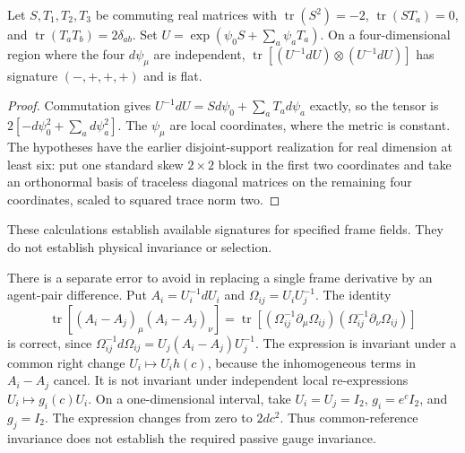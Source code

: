 \begin{proposition}
\label{prop:4d_signature}
Let $S,T_1,T_2,T_3$ be commuting real matrices with $\operatorname{tr}(S^2)=-2$, $\operatorname{tr}(ST_a)=0$, and $\operatorname{tr}(T_aT_b)=2\delta_{ab}$. Set $U=\exp(\psi_0S+\sum_a\psi_aT_a)$. On a four-dimensional region where the four $d\psi_\mu$ are independent, $\operatorname{tr}[(U^{-1}dU)\otimes(U^{-1}dU)]$ has signature $(-,+,+,+)$ and is flat.
\end{proposition}
\begin{proof}
Commutation gives $U^{-1}dU=S d\psi_0+\sum_aT_a d\psi_a$ exactly, so the tensor is $2[-d\psi_0^2+\sum_a d\psi_a^2]$. The $\psi_\mu$ are local coordinates, where the metric is constant. The hypotheses have the earlier disjoint-support realization for real dimension at least six: put one standard skew $2\times2$ block in the first two coordinates and take an orthonormal basis of traceless diagonal matrices on the remaining four coordinates, scaled to squared trace norm two.
\end{proof}
These calculations establish available signatures for specified frame fields. They do not establish physical invariance or selection.

There is a separate error to avoid in replacing a single frame derivative by an agent-pair difference. Put $A_i=U_i^{-1}dU_i$ and $\Omega_{ij}=U_iU_j^{-1}$. The identity
\begin{equation}
\operatorname{tr}[(A_i-A_j)_\mu(A_i-A_j)_\nu]
=\operatorname{tr}[(\Omega_{ij}^{-1}\partial_\mu\Omega_{ij})(\Omega_{ij}^{-1}\partial_\nu\Omega_{ij})]
\label{eq:lor-pair-trace-identity}
\end{equation}
is correct, since $\Omega_{ij}^{-1}d\Omega_{ij}=U_j(A_i-A_j)U_j^{-1}$. The expression is invariant under a common right change $U_i\mapsto U_ih(c)$, because the inhomogeneous terms in $A_i-A_j$ cancel. It is not invariant under independent local re-expressions $U_i\mapsto g_i(c)U_i$. On a one-dimensional interval, take $U_i=U_j=I_2$, $g_i=e^cI_2$, and $g_j=I_2$. The expression changes from zero to $2dc^2$. Thus common-reference invariance does not establish the required passive gauge invariance.

